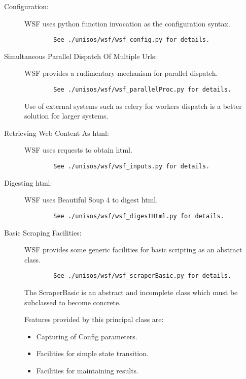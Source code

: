 \documentclass{article}
\begin{document}
\begin{description}
  \item[Configuration:]
        WSF uses python function invocation as the configuration syntax.
\begin{verbatim}
        See ./unisos/wsf/wsf_config.py for details.
\end{verbatim}

  \item[Simultaneous Parallel Dispatch Of Multiple Urls:]
        WSF provides a rudimentary mechanism for parallel dispatch.
\begin{verbatim}
        See ./unisos/wsf/wsf_parallelProc.py for details.
\end{verbatim}
        Use of external systems such as celery for workers dispatch is a better solution for
        larger systems.

  \item[Retrieving Web Content As html:]
        WSF uses requests to obtain html.
\begin{verbatim}
        See ./unisos/wsf/wsf_inputs.py for details.
\end{verbatim}

  \item[Digesting html:]
        WSF uses Beautiful Soup 4 to digest html.
\begin{verbatim}
        See ./unisos/wsf/wsf_digestHtml.py for details.
\end{verbatim}

  \item[Basic Scraping Facilities:]
        WSF provides some generic facilities for basic scripting as an abstract class.
\begin{verbatim}
        See ./unisos/wsf/wsf_scraperBasic.py for details.
\end{verbatim}

        The ScraperBasic is an abstract and incomplete class which must be subclassed
        to become concrete.

        Features provided by this principal class are:
        \begin{itemize}
          \item Capturing of Config parameters.
          \item Facilities for simple state transition.
          \item Facilities for maintaining results.

        \end{itemize}


\end{description}
\end{document}
